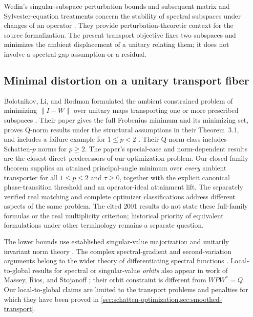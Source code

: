 \documentclass[11pt]{article}
\begin{document}
Wedin's singular-subspace perturbation bounds and subsequent matrix
and Sylvester-equation treatments concern the stability of spectral
subspaces under changes of an operator
\citep{wedin1972perturbation,stewart1990matrix,grubisic2005sylvester,grubisic2010tan}.
They provide perturbation-theoretic context for the source formalization.
The present transport objective fixes two subspaces and minimizes the
ambient displacement of a unitary relating them; it does not involve
a spectral-gap assumption or a residual.

\subsection{Minimal distortion on a unitary transport fiber}
\label{sec:related-minimal-distortion}

Bolotnikov, Li, and Rodman formulated the ambient constrained problem
of minimizing $\|I-W\|$ over unitary maps transporting one or more
prescribed subspaces \citep[Problem~1.1]{bolotnikov2001minimal}.
Their paper gives the full Frobenius minimum and its minimizing set,
proves Q-norm results under the structural assumptions in their
Theorem~3.1, and includes a failure example for $1\le p<2$
\citep[Lemma~3.3]{bolotnikov2001minimal}.  Their Q-norm class
includes Schatten-$p$ norms for $p\ge2$.  The paper's special-case and
norm-dependent results are the closest direct predecessors of our
optimization problem.  Our closed-family theorem supplies an attained
principal-angle minimum over \emph{every} ambient transporter for all
$1\le p\le2$ and $\tau\ge0$, together with the explicit canonical
phase-transition threshold and an operator-ideal attainment lift.
The separately verified real matching and complete optimizer
classifications address different aspects of the same problem.
The cited 2001 results do not state these full-family formulas or the
real multiplicity criterion; historical priority of equivalent
formulations under other terminology remains a separate question.

The lower bounds use established singular-value majorization and
unitarily invariant norm theory \citep{bhatia1997matrix}.
The complex spectral-gradient and second-variation arguments belong to
the wider theory of differentiating spectral functions
\citep{lewis1996derivatives,lewis2001twice}.  Local-to-global results
for spectral or singular-value \emph{orbits} also appear in work of
Massey, Rios, and Stojanoff \citep{massey2018local}; their orbit
constraint is different from $WPW^*=Q$.  Our local-to-global claims
are limited to the transport problems and penalties for which they
have been proved in \cref{sec:schatten-optimization,sec:smoothed-transport}.
\end{document}
